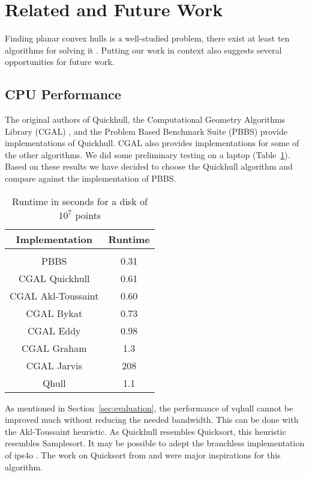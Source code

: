 \section{Related and Future Work}\label{sec:related}

Finding planar convex hulls is a well-studied problem, there exist at least ten
algorithms for solving it \cite{Graham72, Jarvis73, Eddy77, Preparata77, 
Bykat78, Akl78, Andrew79, Clarkson93, Barber96, Chan96}. Putting our
work in context also suggests several opportunities for future work.

\subsection{CPU Performance}

The original authors of Quickhull, the Computational Geometry Algorithms
Library (CGAL) \cite{CGAL}, and the Problem Based Benchmark Suite (PBBS) 
\cite{pbbs} provide implementations of Quickhull. CGAL also provides 
implementations for some of the other algorithms.
We did some preliminary testing on a laptop (Table~\ref{table:reference}).
Based on these results we have decided to choose the Quickhull algorithm and
compare against the implementation of PBBS.

\begin{table}[ht]
    \caption{Runtime in seconds for a disk of $10^7$ points}
    \label{table:reference}
    \begin{tabular}{c | c }
     Implementation & Runtime \\ 
     \hline \\
     PBBS & 0.31 \\  
     CGAL Quickhull & 0.61 \\
     CGAL Akl-Toussaint & 0.60 \\
     CGAL Bykat & 0.73 \\
     CGAL Eddy & 0.98 \\
     CGAL Graham & 1.3 \\
     CGAL Jarvis & 208 \\
     Qhull & 1.1 \\
    \end{tabular}
\end{table}

As mentioned in Section~\ref{sec:evaluation}, the performance of vqhull cannot
be improved much without reducing the needed bandwidth. This can be done
with the Akl-Toussaint heuristic. As Quickhull resembles Quicksort, this 
heuristic resembles Samplesort. It may be possible to adept the branchless 
implementation of ips4o \cite{ips4o}. The work on Quicksort from \cite{Bramas17}
and \cite{francis92} were major inspirations for this algorithm.

